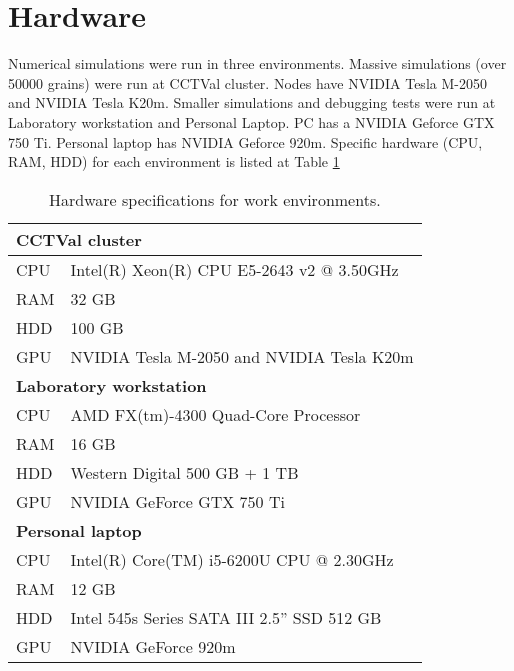 \section{Hardware}
Numerical simulations were run in three environments. Massive simulations (over 50000 grains) were run at CCTVal cluster. Nodes have NVIDIA Tesla M-2050 and NVIDIA Tesla K20m. Smaller simulations and debugging tests were run at Laboratory workstation and Personal Laptop. PC has a NVIDIA Geforce GTX 750 Ti. Personal laptop has NVIDIA Geforce 920m. Specific hardware (CPU, RAM, HDD) for each environment is listed at Table \ref{tab:hardware}

\begin{table}[ht]
    \centering
    \begin{tabular}{|l|l|}
        \hline
        \multicolumn{2}{|l|}{\textbf{CCTVal cluster}}\\
        \hline
        CPU & Intel(R) Xeon(R) CPU E5-2643 v2 @ 3.50GHz\\
        RAM & 32 GB\\
        HDD & 100 GB\\
        GPU & NVIDIA Tesla M-2050 and NVIDIA Tesla K20m \\
        \hline
        \hline
        \multicolumn{2}{|l|}{\textbf{Laboratory workstation}}\\
        \hline
        CPU & AMD FX(tm)-4300 Quad-Core Processor\\
        RAM & 16 GB\\
        HDD & Western Digital 500 GB + 1 TB\\
        GPU & NVIDIA GeForce GTX 750 Ti\\
        \hline 
        \hline
        \multicolumn{2}{|l|}{\textbf{Personal laptop}}\\
        \hline
        CPU & Intel(R) Core(TM) i5-6200U CPU @ 2.30GHz\\
        RAM & 12 GB\\
        HDD & Intel 545s Series SATA III 2.5'' SSD 512 GB \\
        GPU & NVIDIA GeForce 920m\\
        \hline 
    \end{tabular}
    
    \caption{Hardware specifications for work environments.}
    \label{tab:hardware}
\end{table}